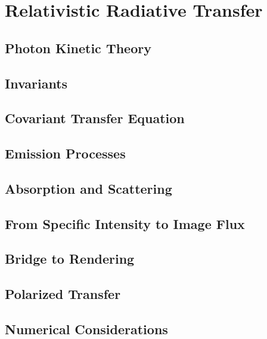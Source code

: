\chapter{Relativistic Radiative Transfer}\label{ch:radiative-transfer}

\section{Photon Kinetic Theory}\label{sec:photon-kinetic-theory}

\section{Invariants}\label{sec:invariants}

\section{Covariant Transfer Equation}\label{sec:covariant-transfer-equation}

\section{Emission Processes\optmark}\label{sec:emission-processes}

\section{Absorption and Scattering\optmark}\label{sec:absorption-and-scattering}

\section{From Specific Intensity to Image Flux}\label{sec:from-specific-intensity-to-image-flux}

\section{Bridge to Rendering}\label{sec:bridge-to-rendering}

\section{Polarized Transfer\optmark}\label{sec:polarized-transfer}

\section{Numerical Considerations}\label{sec:numerical-considerations}
